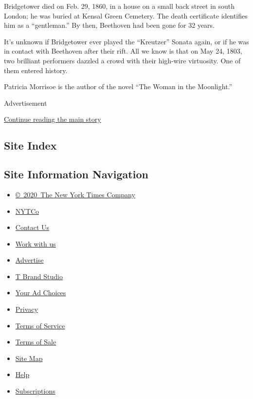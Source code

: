 Bridgetower died on Feb. 29, 1860, in a house on a small back street in
south London; he was buried at Kensal Green Cemetery. The death
certificate identifies him as a ``gentleman.'' By then, Beethoven had
been gone for 32 years.

It's unknown if Bridgetower ever played the ``Kreutzer'' Sonata again,
or if he was in contact with Beethoven after their rift. All we know is
that on May 24, 1803, two brilliant performers dazzled a crowd with
their high-wire virtuosity. One of them entered history.

Patricia Morrisoe is the author of the novel ``The Woman in the
Moonlight.''

Advertisement

\protect\hyperlink{after-bottom}{Continue reading the main story}

\hypertarget{site-index}{%
\subsection{Site Index}\label{site-index}}

\hypertarget{site-information-navigation}{%
\subsection{Site Information
Navigation}\label{site-information-navigation}}

\begin{itemize}
\tightlist
\item
  \href{https://help.nytimes3xbfgragh.onion/hc/en-us/articles/115014792127-Copyright-notice}{©~2020~The
  New York Times Company}
\end{itemize}

\begin{itemize}
\tightlist
\item
  \href{https://www.nytco.com/}{NYTCo}
\item
  \href{https://help.nytimes3xbfgragh.onion/hc/en-us/articles/115015385887-Contact-Us}{Contact
  Us}
\item
  \href{https://www.nytco.com/careers/}{Work with us}
\item
  \href{https://nytmediakit.com/}{Advertise}
\item
  \href{http://www.tbrandstudio.com/}{T Brand Studio}
\item
  \href{https://www.nytimes3xbfgragh.onion/privacy/cookie-policy\#how-do-i-manage-trackers}{Your
  Ad Choices}
\item
  \href{https://www.nytimes3xbfgragh.onion/privacy}{Privacy}
\item
  \href{https://help.nytimes3xbfgragh.onion/hc/en-us/articles/115014893428-Terms-of-service}{Terms
  of Service}
\item
  \href{https://help.nytimes3xbfgragh.onion/hc/en-us/articles/115014893968-Terms-of-sale}{Terms
  of Sale}
\item
  \href{https://spiderbites.nytimes3xbfgragh.onion}{Site Map}
\item
  \href{https://help.nytimes3xbfgragh.onion/hc/en-us}{Help}
\item
  \href{https://www.nytimes3xbfgragh.onion/subscription?campaignId=37WXW}{Subscriptions}
\end{itemize}
